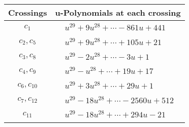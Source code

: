 \documentclass[1p]{elsarticle_modified}
\theoremstyle{definition}
\begin{document}
\begin{tabular}{m{50pt}|m{274pt}}
Crossings & \hspace{64pt}u-Polynomials at each crossing \\
\hline $$\begin{aligned}c_{1}\end{aligned}$$&$\begin{aligned}
&u^{29}+9 u^{28}+\cdots-861 u+441
\end{aligned}$\\
\hline $$\begin{aligned}c_{2},c_{5}\end{aligned}$$&$\begin{aligned}
&u^{29}+9 u^{28}+\cdots+105 u+21
\end{aligned}$\\
\hline $$\begin{aligned}c_{3},c_{8}\end{aligned}$$&$\begin{aligned}
&u^{29}-2 u^{28}+\cdots-3 u+1
\end{aligned}$\\
\hline $$\begin{aligned}c_{4},c_{9}\end{aligned}$$&$\begin{aligned}
&u^{29}- u^{28}+\cdots+19 u+17
\end{aligned}$\\
\hline $$\begin{aligned}c_{6},c_{10}\end{aligned}$$&$\begin{aligned}
&u^{29}+3 u^{28}+\cdots+29 u+1
\end{aligned}$\\
\hline $$\begin{aligned}c_{7},c_{12}\end{aligned}$$&$\begin{aligned}
&u^{29}-18 u^{28}+\cdots-2560 u+512
\end{aligned}$\\
\hline $$\begin{aligned}c_{11}\end{aligned}$$&$\begin{aligned}
&u^{29}-18 u^{28}+\cdots+294 u-21
\end{aligned}$\\
\hline
\end{tabular}\\~\\
\newpage\renewcommand{\arraystretch}{1}
\end{document}
